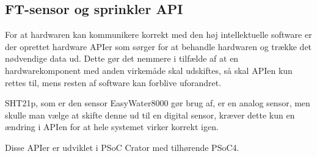 \subsection{FT-sensor og sprinkler API}

For at hardwaren kan kommunikere korrekt med den høj intellektuelle software er der oprettet hardware APIer som sørger for at behandle hardwaren og trække det nødvendige data ud. Dette gør det nemmere i tilfælde af at en hardwarekomponent med anden virkemåde skal udskiftes, så skal APIen kun rettes til, mens resten af software kan forblive uforandret. 

SHT21p, som er den sensor EasyWater8000 gør brug af, er en analog sensor, men skulle man vælge at skifte denne ud til en digital sensor, kræver dette kun en ændring i APIen for at hele systemet virker korrekt igen. 

Disse APIer er udviklet i PSoC Crator med tilhørende PSoC4. 